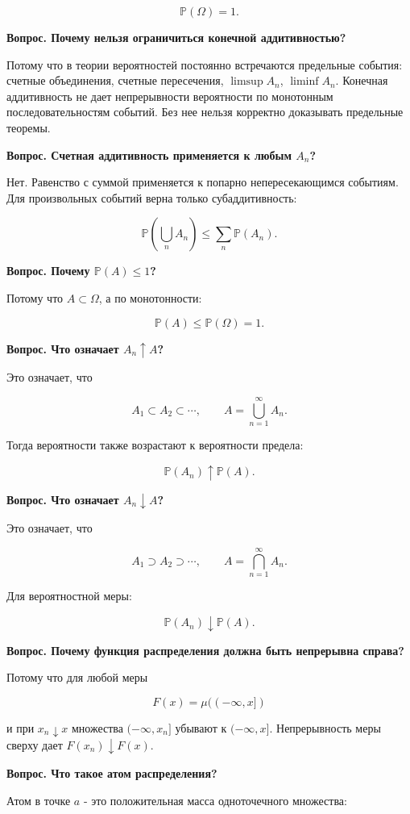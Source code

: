 \documentclass[
  11pt,
  a4paper,
]{article}
\begin{document}
\[
\mathbb P(\Omega)=1.
\]

\textbf{Вопрос. Почему нельзя ограничиться конечной аддитивностью?}

Потому что в теории вероятностей постоянно встречаются предельные
события: счетные объединения, счетные пересечения, \(\limsup A_n\),
\(\liminf A_n\). Конечная аддитивность не дает непрерывности вероятности
по монотонным последовательностям событий. Без нее нельзя корректно
доказывать предельные теоремы.

\textbf{Вопрос. Счетная аддитивность применяется к любым \(A_n\)?}

Нет. Равенство с суммой применяется к попарно непересекающимся событиям.
Для произвольных событий верна только субаддитивность:

\[
\mathbb P\left(\bigcup_n A_n\right)\le \sum_n\mathbb P(A_n).
\]

\textbf{Вопрос. Почему \(\mathbb P(A)\le1\)?}

Потому что \(A\subset\Omega\), а по монотонности:

\[
\mathbb P(A)\le\mathbb P(\Omega)=1.
\]

\textbf{Вопрос. Что означает \(A_n\uparrow A\)?}

Это означает, что

\[
A_1\subset A_2\subset\cdots,
\qquad
A=\bigcup_{n=1}^{\infty}A_n.
\]

Тогда вероятности также возрастают к вероятности предела:

\[
\mathbb P(A_n)\uparrow\mathbb P(A).
\]

\textbf{Вопрос. Что означает \(A_n\downarrow A\)?}

Это означает, что

\[
A_1\supset A_2\supset\cdots,
\qquad
A=\bigcap_{n=1}^{\infty}A_n.
\]

Для вероятностной меры:

\[
\mathbb P(A_n)\downarrow\mathbb P(A).
\]

\textbf{Вопрос. Почему функция распределения должна быть непрерывна
справа?}

Потому что для любой меры

\[
F(x)=\mu((-\infty,x])
\]

и при \(x_n\downarrow x\) множества \((-\infty,x_n]\) убывают к
\((-\infty,x]\). Непрерывность меры сверху дает
\(F(x_n)\downarrow F(x)\).

\textbf{Вопрос. Что такое атом распределения?}

Атом в точке \(a\) - это положительная масса одноточечного множества:
\end{document}
